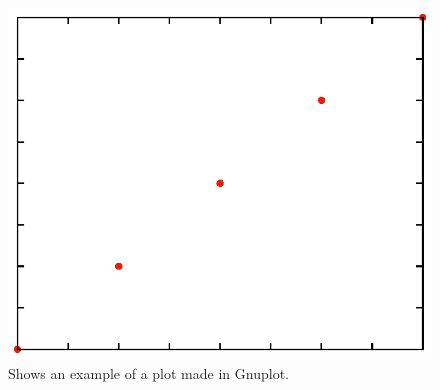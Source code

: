 \documentclass{article}
\begin{document}
\begin{figure}
	\centering
	\includegraphics{test_plot}
	
	\caption{\label{fig:test} Shows an example of a plot made in Gnuplot.}
\end{figure}
\end{document}
